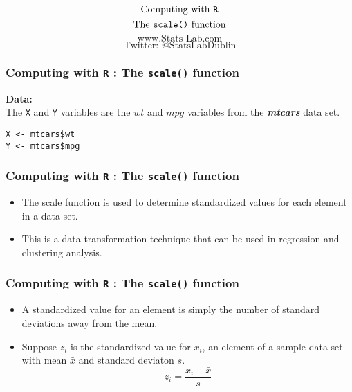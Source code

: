 \documentclass{beamer}
\begin{document}
\begin{frame}
\Huge
\[\mbox{Computing with \texttt{R}}\]
\[\mbox{The \texttt{scale()} function}\]
\bigskip
\LARGE
\[\mbox{www.Stats-Lab.com}\]
\[\mbox{Twitter: @StatsLabDublin}\]
\end{frame}
\begin{frame}[fragile]
\frametitle{Computing with \texttt{R} : The \texttt{scale()} function}
\Large
\vspace{-1cm}
\textbf{Data:} \\
The \texttt{X} and \texttt{Y} variables are the $wt$ and $mpg$ variables from the \textit{\textbf{\textit{mtcars}}} data set.

\begin{framed}
\begin{verbatim}
X <- mtcars$wt
Y <- mtcars$mpg
\end{verbatim}
\end{framed}

\end{frame}
\begin{frame}
\frametitle{Computing with \texttt{R} : The \texttt{scale()} function}
\Large
\vspace{-1cm}
\begin{itemize}
\item The scale function is used to determine standardized values for each element in a data set.
\vspace{0.2cm}
\item This is a data transformation technique that can be used in regression and clustering analysis.
\end{itemize}
\end{frame}
\begin{frame}
\frametitle{Computing with \texttt{R} : The \texttt{scale()} function}
\Large
\begin{itemize}
\item A standardized value for an element is simply the number of standard deviations away from the mean.
\item Suppose $z_i$ is the standardized value for $x_i$, an element of a sample data set with mean $\bar{x}$ and standard deviaton $s$.
\[z_i = \frac{x_i-\bar{x}}{s}\]
\end{itemize}
\end{frame}
\end{document}
